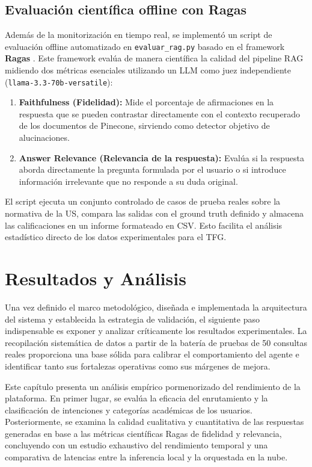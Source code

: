 \documentclass[12pt,a4paper,oneside]{report}
\begin{document}
\section{Evaluación científica offline con Ragas}

Además de la monitorización en tiempo real, se implementó un script de evaluación offline automatizado en \texttt{evaluar\_rag.py} basado en el framework \textbf{Ragas} \cite{ragas_docs}. Este framework evalúa de manera científica la calidad del pipeline RAG midiendo dos métricas esenciales utilizando un LLM como juez independiente (\texttt{llama-3.3-70b-versatile}):
\begin{enumerate}
    \item \textbf{Faithfulness (Fidelidad):} Mide el porcentaje de afirmaciones en la respuesta que se pueden contrastar directamente con el contexto recuperado de los documentos de Pinecone, sirviendo como detector objetivo de alucinaciones.
    \item \textbf{Answer Relevance (Relevancia de la respuesta):} Evalúa si la respuesta aborda directamente la pregunta formulada por el usuario o si introduce información irrelevante que no responde a su duda original.
\end{enumerate}

El script ejecuta un conjunto controlado de casos de prueba reales sobre la normativa de la US, compara las salidas con el ground truth definido y almacena las calificaciones en un informe formateado en CSV. Esto facilita el análisis estadístico directo de los datos experimentales para el TFG.

\chapter{Resultados y Análisis}
\label{ch:resultados}

Una vez definido el marco metodológico, diseñada e implementada la arquitectura del sistema y establecida la estrategia de validación, el siguiente paso indispensable es exponer y analizar críticamente los resultados experimentales. La recopilación sistemática de datos a partir de la batería de pruebas de 50 consultas reales proporciona una base sólida para calibrar el comportamiento del agente e identificar tanto sus fortalezas operativas como sus márgenes de mejora.

Este capítulo presenta un análisis empírico pormenorizado del rendimiento de la plataforma. En primer lugar, se evalúa la eficacia del enrutamiento y la clasificación de intenciones y categorías académicas de los usuarios. Posteriormente, se examina la calidad cualitativa y cuantitativa de las respuestas generadas en base a las métricas científicas Ragas de fidelidad y relevancia, concluyendo con un estudio exhaustivo del rendimiento temporal y una comparativa de latencias entre la inferencia local y la orquestada en la nube.
\end{document}
